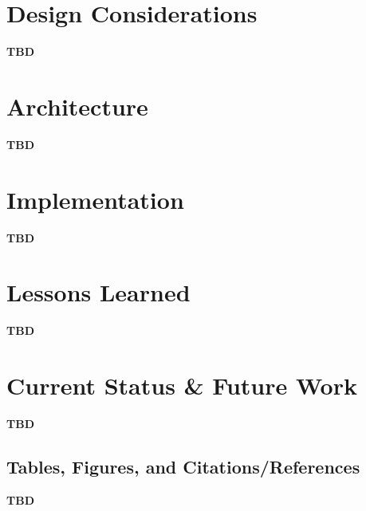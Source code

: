 \documentclass{sig-alternate}
\begin{document}
\section{Design Considerations}
\label{design considerations}

\textbf{TBD}

\section{Architecture}
\label{architecture}

\textbf{TBD}

\section{Implementation}
\label{implementation}

\textbf{TBD}

\section{Lessons Learned}
\label{mistakes}

\textbf{TBD}

\section{Current Status \& Future Work}
\label{current status}

\textbf{TBD}

\subsection{Tables, Figures, and Citations/References}

\textbf{TBD}



\balance
\end{document}
